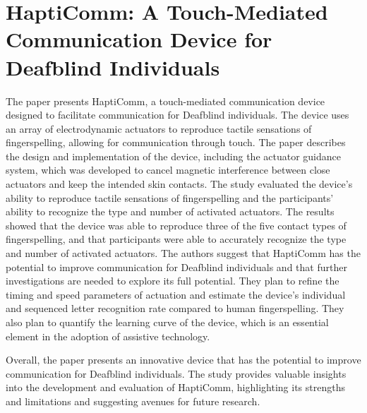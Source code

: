 \documentclass[12pt,a4paper]{report}
\begin{document}
\section{HaptiComm: A Touch-Mediated Communication Device for Deafblind Individuals }
The paper\cite{ref8} presents HaptiComm, a touch-mediated communication device designed to facilitate communication for Deafblind individuals. The device uses an array of electrodynamic actuators to reproduce tactile sensations of fingerspelling, allowing for communication through touch. The paper describes the design and implementation of the device, including the actuator guidance system, which was developed to cancel magnetic interference between close actuators and keep the intended skin contacts. The study evaluated the device's ability to reproduce tactile sensations of fingerspelling and the participants' ability to recognize the type and number of activated actuators. The results showed that the device was able to reproduce three of the five contact types of fingerspelling, and that participants were able to accurately recognize the type and number of activated actuators. The authors suggest that HaptiComm has the potential to improve communication for Deafblind individuals and that further investigations are needed to explore its full potential. They plan to refine the timing and speed parameters of actuation and estimate the device's individual and sequenced letter recognition rate compared to human fingerspelling. They also plan to quantify the learning curve of the device, which is an essential element in the adoption of assistive technology. 

Overall, the paper presents an innovative device that has the potential to improve communication for Deafblind individuals. The study provides valuable insights into the development and evaluation of HaptiComm, highlighting its strengths and limitations and suggesting avenues for future research.
\end{document}
